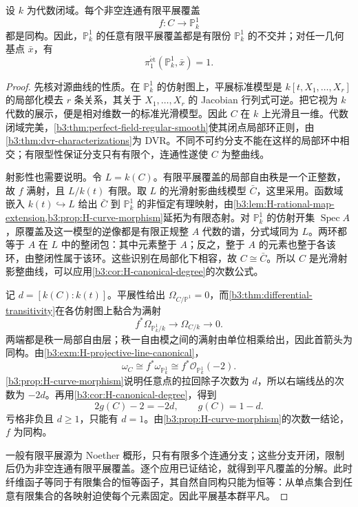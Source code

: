 \begin{proposition}\label{b3:prop:I-projective-line-covers}
	设 \(k\) 为代数闭域。每个非空连通有限平展覆盖
	\[
		f:C\longrightarrow\mathbb P_k^1
	\]
	都是同构。因此，\(\mathbb P_k^1\) 的任意有限平展覆盖都是有限份 \(\mathbb P_k^1\) 的不交并；对任一几何基点 \(\bar x\)，有
	\[
		\pi_1^{\mathrm{\acute et}}(\mathbb P_k^1,\bar x)=1.
	\]
\end{proposition}
\begin{proof}
	先核对源曲线的性质。在 \(\mathbb P_k^1\) 的仿射图上，平展标准模型是 \(k[t,X_1,\ldots,X_r]\) 的局部化模去 \(r\) 条关系，其关于 \(X_1,\ldots,X_r\) 的 Jacobian 行列式可逆。把它视为 \(k\) 代数的展示，便是相对维数一的标准光滑模型。因此 \(C\) 在 \(k\) 上光滑且一维。代数闭域完美，\cref{b3:thm:perfect-field-regular-smooth}使其闭点局部环正则，由\cref{b3:thm:dvr-characterizations}为 DVR。不同不可约分支不能在这样的局部环中相交；有限型性保证分支只有有限个，连通性遂使 \(C\) 为整曲线。

	射影性也需要说明。令 \(L=k(C)\)。有限平展覆盖的局部自由秩是一个正整数，故 \(f\) 满射，且 \(L/k(t)\) 有限。取 \(L\) 的光滑射影曲线模型 \(\bar C\)，这里采用\cite[Chapter I, Theorem 6.9, pp. 44--45]{Hartshorne1977}。函数域嵌入 \(k(t)\hookrightarrow L\) 给出 \(\bar C\) 到 \(\mathbb P_k^1\) 的非恒定有理映射，由\cref{b3:lem:H-rational-map-extension,b3:prop:H-curve-morphism}延拓为有限态射。对 \(\mathbb P_k^1\) 的仿射开集 \(\operatorname{Spec}A\)，原覆盖及这一模型的逆像都是有限正规整 \(A\) 代数的谱，分式域同为 \(L\)。两环都等于 \(A\) 在 \(L\) 中的整闭包：其中元素整于 \(A\)；反之，整于 \(A\) 的元素也整于各该环，由整闭性属于该环。这些识别在局部化下相容，故 \(C\cong\bar C\)。所以 \(C\) 是光滑射影整曲线，可以应用\cref{b3:cor:H-canonical-degree}的次数公式。

	记 \(d=[k(C):k(t)]\)。平展性给出 \(\Omega_{C/\mathbb P^1}=0\)，而\cref{b3:thm:differential-transitivity}在各仿射图上黏合为满射
	\[
		f^*\Omega_{\mathbb P_k^1/k}\longrightarrow\Omega_{C/k}
		\longrightarrow0.
	\]
	两端都是秩一局部自由层；秩一自由模之间的满射由单位相乘给出，因此首箭头为同构。由\cref{b3:exm:H-projective-line-canonical}，
	\[
		\omega_C\cong f^*\omega_{\mathbb P_k^1}
		\cong f^*\mathcal O_{\mathbb P_k^1}(-2).
	\]
	\cref{b3:prop:H-curve-morphism}说明任意点的拉回除子次数为 \(d\)，所以右端线丛的次数为 \(-2d\)。再用\cref{b3:cor:H-canonical-degree}，得到
	\[
		2g(C)-2=-2d,\qquad g(C)=1-d.
	\]
	亏格非负且 \(d\ge1\)，只能有 \(d=1\)。由\cref{b3:prop:H-curve-morphism}的次数一结论，\(f\) 为同构。

	一般有限平展源为 Noether 概形，只有有限多个连通分支；这些分支开闭，限制后仍为非空连通有限平展覆盖。逐个应用已证结论，就得到平凡覆盖的分解。此时纤维函子等同于有限集合的恒等函子，其自然自同构只能为恒等：从单点集合到任意有限集合的各映射迫使每个元素固定。因此平展基本群平凡。
\end{proof}

